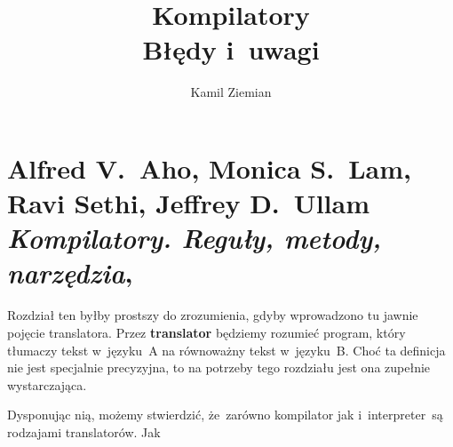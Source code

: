 \documentclass[a4paper,11pt]{article}
\title{Kompilatory \\
  {\Large Błędy i~uwagi}}
\author{Kamil Ziemian}
\numberwithin{equation}{section}
\begin{document}





\maketitle










\section{Alfred V.~Aho, Monica S.~Lam, Ravi Sethi,
  Jeffrey D.~Ullam \textit{Kompilatory. Reguły, metody,
    narzędzia},
  \parencite{Aho-Lam-Sethi-Ullman-Kompilatory-Pub-2019}}

\vspace{0em}



\vspace{0em}


\noindent
Rozdział ten byłby prostszy do zrozumienia, gdyby wprowadzono tu jawnie
pojęcie translatora. Przez \textbf{translator} będziemy rozumieć program,
który tłumaczy tekst w~języku~A na równoważny tekst w~języku~B. Choć ta
definicja nie jest specjalnie precyzyjna, to na potrzeby tego rozdziału
jest ona zupełnie wystarczająca.

Dysponując nią, możemy stwierdzić, że~zarówno kompilator jak
i~interpreter~są rodzajami translatorów. Jak







\end{document}
